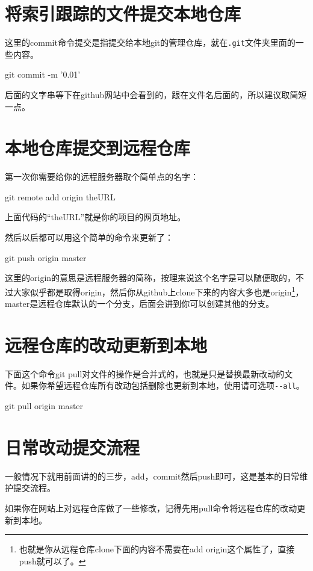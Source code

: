 \documentclass[11pt,oneside]{book}
\begin{document}
\section{将索引跟踪的文件提交本地仓库}
这里的commit命令提交是指提交给本地git的管理仓库，就在\verb+.git+文件夹里面的一些内容。
\begin{tcbbash}[]
git  commit   -m  '0.01' 
\end{tcbbash}

后面的文字串等下在github网站中会看到的，跟在文件名后面的，所以建议取简短一点。



\section{本地仓库提交到远程仓库}
第一次你需要给你的远程服务器取个简单点的名字：
\begin{tcbbash}[]
git remote add origin theURL
\end{tcbbash}

上面代码的“theURL”就是你的项目的网页地址。

然后以后都可以用这个简单的命令来更新了：
\begin{tcbbash}[]
git  push  origin  master
\end{tcbbash}

这里的origin的意思是远程服务器的简称，按理来说这个名字是可以随便取的，不过大家似乎都是取得origin，然后你从github上clone下来的内容大多也是origin\footnote{也就是你从远程仓库clone下面的内容不需要在add origin这个属性了，直接push就可以了。}，master是远程仓库默认的一个分支，后面会讲到你可以创建其他的分支。

\section{远程仓库的改动更新到本地}
下面这个命令git pull对文件的操作是合并式的，也就是只是替换最新改动的文件。如果你希望远程仓库所有改动包括删除也更新到本地，使用请可选项\verb+--all+。
\begin{tcbbash}[]
git  pull origin master
\end{tcbbash}


\section{日常改动提交流程}
一般情况下就用前面讲的的三步，add，commit然后push即可，这是基本的日常维护提交流程。

如果你在网站上对远程仓库做了一些修改，记得先用pull命令将远程仓库的改动更新到本地。
\end{document}
